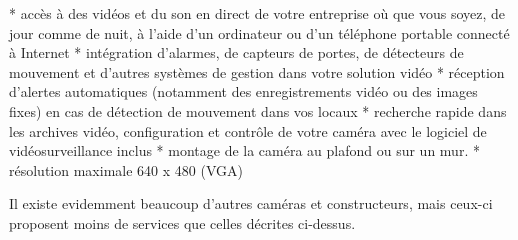     * accès à des vidéos et du son en direct de votre entreprise où que vous
    soyez, de jour comme de nuit, à l'aide d'un ordinateur ou d'un téléphone
    portable connecté à Internet
    * intégration d'alarmes, de capteurs de portes, de détecteurs de mouvement
    et d'autres systèmes de gestion dans votre solution vidéo 
    * réception d'alertes automatiques (notamment des enregistrements vidéo ou
    des images fixes) en cas de détection de mouvement dans vos locaux
    * recherche rapide dans les archives vidéo, configuration et contrôle de
    votre caméra avec le logiciel de vidéosurveillance inclus
    * montage de la caméra au plafond ou sur un mur.
	* résolution maximale 640 x 480 (VGA)
	
Il existe evidemment beaucoup d'autres caméras et constructeurs, mais ceux-ci
proposent moins de services que celles décrites ci-dessus.
		
		
		
		
		
		